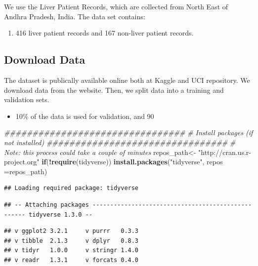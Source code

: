 \documentclass[]{article}
\newenvironment{Shaded}{\begin{snugshade}}{\end{snugshade}}
\newcommand{\CommentTok}[1]{\textcolor[rgb]{0.56,0.35,0.01}{\textit{#1}}}
\newcommand{\ControlFlowTok}[1]{\textcolor[rgb]{0.13,0.29,0.53}{\textbf{#1}}}
\newcommand{\DataTypeTok}[1]{\textcolor[rgb]{0.13,0.29,0.53}{#1}}
\newcommand{\KeywordTok}[1]{\textcolor[rgb]{0.13,0.29,0.53}{\textbf{#1}}}
\newcommand{\NormalTok}[1]{#1}
\newcommand{\OperatorTok}[1]{\textcolor[rgb]{0.81,0.36,0.00}{\textbf{#1}}}
\newcommand{\StringTok}[1]{\textcolor[rgb]{0.31,0.60,0.02}{#1}}
\begin{document}
We use the Liver Patient Records, which are collected from North East of
Andhra Pradesh, India. The data set contains:

\begin{enumerate}
\item 416 liver patient records and 167 non-liver patient records.
\end{enumerate}

\subsection{Download Data}
\label{sec:dd}

The dataset is publically available online both at Kaggle and UCI
repository. We download data from the website. Then, we split data into
a training and validation sets.

\begin{itemize}
\item 10\% of the data is used for validation, and 90%
\end{itemize}

\begin{Shaded}
\begin{Highlighting}[]
\CommentTok{################################}
\CommentTok{#  Install packages (if not installed)}
\CommentTok{################################}
\CommentTok{# Note: this process could take a couple of minutes}
\NormalTok{repos_path<-}\StringTok{ "http://cran.us.r-project.org"}
\ControlFlowTok{if}\NormalTok{(}\OperatorTok{!}\KeywordTok{require}\NormalTok{(tidyverse)) }\KeywordTok{install.packages}\NormalTok{(}\StringTok{"tidyverse"}\NormalTok{, }\DataTypeTok{repos =}\NormalTok{repos_path)}
\end{Highlighting}
\end{Shaded}

\begin{verbatim}
## Loading required package: tidyverse
\end{verbatim}

\begin{verbatim}
## -- Attaching packages --------------------------------------------------- tidyverse 1.3.0 --
\end{verbatim}

\begin{verbatim}
## v ggplot2 3.2.1     v purrr   0.3.3
## v tibble  2.1.3     v dplyr   0.8.3
## v tidyr   1.0.0     v stringr 1.4.0
## v readr   1.3.1     v forcats 0.4.0
\end{verbatim}
\end{document}
